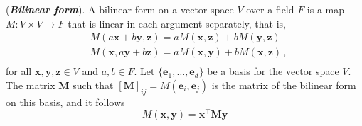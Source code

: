 \begin{definition}
\label{def-bilinear-form}
(\textbf{\emph{Bilinear form}}).
%
A  bilinear form on a vector space $V$ over a field $F$ is a map $M: V \times V \to F$ that is linear in each argument separately, that is, 
%
\begin{equation}
\begin{split}
    & M(a\bm{x} + b\bm{y}, \bm{z}) = aM(\bm{x}, \bm{z}) + bM(\bm{y}, \bm{z}) \\
    & M( \bm{x}, a\bm{y} + b\bm{z}) = aM(\bm{x}, \bm{y}) + bM(\bm{x}, \bm{z}) \,,\\
\end{split}
\end{equation}
for all \(\bm{x}, \bm{y}, \bm{z} \in V \) and \( a, b \in F \).
%
Let $\{\bm{e}_1,\dots,\bm{e}_d\}$ be a basis for the vector space $V$.
%
The matrix $\bm{M}$ such that $[\bm{M}]_{ij} = M(\bm{e}_i,\bm{e}_j)$ is the matrix of the bilinear form on this basis, and it follows
%
\begin{equation}
    M(\bm{x},\bm{y}) = \bm{x}^\top\bm{M}\bm{y}
\end{equation}
%
\end{definition}